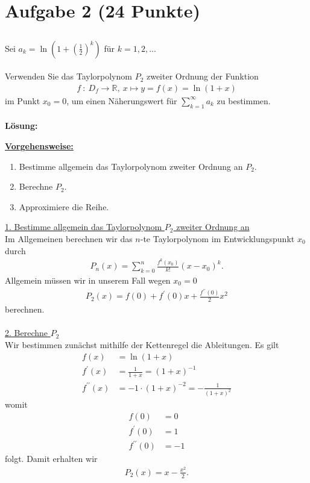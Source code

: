 \section*{Aufgabe 2 (24 Punkte)}
\vspace{0.4cm}
\subsection*{}
Sei $ a_k = \ln \left( 1 + \left( \frac{1}{2}\right)^k \right) $ für $ k = 1,2,... $\\
\\
Verwenden Sie das Taylorpolynom $ P_2 $ zweiter Ordnung der Funktion
\begin{align*}
f \ : \ D_f \to \mathbb{R}, \ x \mapsto y = f(x) = \ln(1+x)
\end{align*}
im Punkt $ x_0 = 0 $, um einen Näherungswert für 
$ \sum_{k=1}^\infty a_k $ zu bestimmen.
\\
\\
\textbf{Lösung:}
\begin{mdframed}
\renewcommand{\labelenumi}{\theenumi.}
\underline{\textbf{Vorgehensweise:}}
\begin{enumerate}
\item Bestimme allgemein das Taylorpolynom zweiter Ordnung an $ P_2 $.
\item Berechne $ P_2 $.
\item Approximiere die Reihe.
\end{enumerate}
\end{mdframed}

\underline{1. Bestimme allgemein das Taylorpolynom $ P_2 $ zweiter Ordnung an}\\
Im Allgemeinen berechnen wir das $ n $-te Taylorpolynom im Entwicklungspunkt $ x_0 $ durch
\begin{align*}
P_n(x) = \sum \limits_{k=0}^n \frac{f^{k}(x_0)}{k!} (x-x_0)^k.
\end{align*}
Allgemein müssen wir in unserem Fall wegen $ x_0 = 0 $
\begin{align*}
P_2(x) 
= 
f(0) + f^{\prime}(0) x + \frac{f^{\prime \prime}(0)}{2} x^2
\end{align*}
berechnen.
\\
\\
\underline{2. Berechne $ P_2 $}\\
Wir bestimmen zunächst mithilfe der Kettenregel die Ableitungen.
Es gilt
\begin{align*}
f(x) &= \ln(1+x)\\
f^\prime(x) &= \frac{1}{1+ x} = (1+x)^{-1}\\
f^{\prime \prime}(x) &=-1 \cdot (1+x)^{-2} = - \frac{1}{(1+x)^2}
\end{align*}
womit 
\begin{align*}
f(0) &= 0 \\
f^\prime(0) &= 1\\
f^{\prime \prime}(0 ) &= -1
\end{align*}
folgt.
Damit erhalten wir 
\begin{align*}
P_2(x) = x - \frac{x^2}{2}.
\end{align*}

